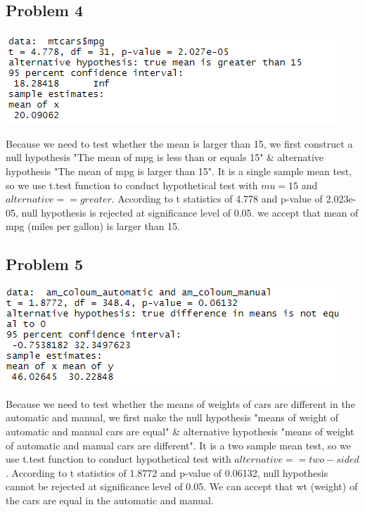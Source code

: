 \documentclass[12pt]{article}
\begin{document}
\subsection*{Problem 4}
\begin{center}
	\includegraphics[]{p4.png}
\end{center}
Because we need to test whether the mean is larger than 15, we first construct a null hypothesis "The mean of mpg is less than or equals 15" \& alternative hypothesis "The mean of mpg is larger than 15". It is a single sample mean test, so we use t.test function to conduct hypothetical test  with $mu = 15$ and $alternative == greater$. According to t statistics of 4.778 and p-value of 2.023e-05, null hypothesis is rejected at significance level of 0.05. we accept that mean of mpg (miles per gallon) is larger than 15.
\subsection*{Problem 5}

\begin{center}
	\includegraphics[]{p5.png}
\end{center}
Because we need to test whether the means of weights of cars are different in the automatic and manual, we first make the null hypothesis "means of weight of automatic and manual cars are equal" \& alternative hypothesis "means of weight of automatic and manual cars are different". It is a two sample mean test, so we use t.test function to conduct hypothetical test with $alternative == two-sided$. According to t statistics of 1.8772 and p-value of 0.06132, null hypothesis cannot be rejected at significance level of 0.05. We can accept that  wt (weight) of the cars are equal in the automatic and manual.
\end{document}
